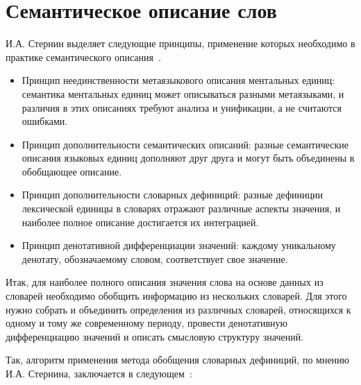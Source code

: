 \documentclass[LI,VKR]{HSEUniversity}
\begin{document}
\section{Семантическое описание слов}

И.А. Стернин выделяет следующие принципы, применение которых необходимо
в практике семантического описания~\cite{SemanticDefinitionsAndAnalysis}.

\begin{itemize}
    \item Принцип неединственности метаязыкового описания ментальных единиц:
семантика ментальных единиц может описываться разными метаязыками,
и различия в этих описаниях требуют анализа и унификации, а не считаются ошибками.
    \item Принцип дополнительности семантических описаний:
разные семантические описания языковых единиц дополняют друг друга и могут быть объединены в обобщающее описание.
    \item Принцип дополнительности словарных дефиниций:
разные дефиниции лексической единицы в словарях отражают различные аспекты значения,
и наиболее полное описание достигается их интеграцией.
    \item Принцип денотативной дифференциации значений:
каждому уникальному денотату, обозначаемому словом, соответствует свое значение.
\end{itemize}

Итак, для наиболее полного описания значения слова на основе данных из словарей
необходимо обобщить информацию из нескольких словарей.
Для этого нужно собрать и объединить определения из различных словарей,
относящихся к одному и тому же современному периоду, провести денотативную дифференциацию значений
и описать смысловую структуру значений.

Так, алгоритм применения метода обобщения словарных дефиниций, по мнению И.А. Стернина, заключается
в следующем~\cite{SemanticDefinitionsAndAnalysis}:
\end{document}
